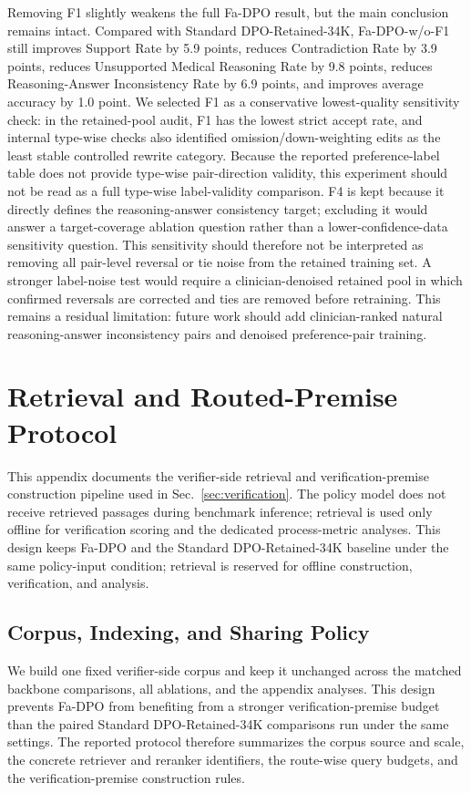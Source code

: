 \documentclass[a4paper,fleqn,doubleblind]{cas-sc}
\begin{document}
Removing F1 slightly weakens the full Fa-DPO result, but the main conclusion remains intact. Compared with Standard DPO-Retained-34K, Fa-DPO-w/o-F1 still improves Support Rate by 5.9 points, reduces Contradiction Rate by 3.9 points, reduces Unsupported Medical Reasoning Rate by 9.8 points, reduces Reasoning-Answer Inconsistency Rate by 6.9 points, and improves average accuracy by 1.0 point. We selected F1 as a conservative lowest-quality sensitivity check: in the retained-pool audit, F1 has the lowest strict accept rate, and internal type-wise checks also identified omission/down-weighting edits as the least stable controlled rewrite category. Because the reported preference-label table does not provide type-wise pair-direction validity, this experiment should not be read as a full type-wise label-validity comparison. F4 is kept because it directly defines the reasoning-answer consistency target; excluding it would answer a target-coverage ablation question rather than a lower-confidence-data sensitivity question. This sensitivity should therefore not be interpreted as removing all pair-level reversal or tie noise from the retained training set. A stronger label-noise test would require a clinician-denoised retained pool in which confirmed reversals are corrected and ties are removed before retraining. This remains a residual limitation: future work should add clinician-ranked natural reasoning-answer inconsistency pairs and denoised preference-pair training.

\section{Retrieval and Routed-Premise Protocol}
\label{app:retrieval_protocol}

This appendix documents the verifier-side retrieval and verification-premise construction pipeline used in Sec.~\ref{sec:verification}. The policy model does not receive retrieved passages during benchmark inference; retrieval is used only offline for verification scoring and the dedicated process-metric analyses. This design keeps Fa-DPO and the Standard DPO-Retained-34K baseline under the same policy-input condition; retrieval is reserved for offline construction, verification, and analysis.

\subsection{Corpus, Indexing, and Sharing Policy}

We build one fixed verifier-side corpus and keep it unchanged across the matched backbone comparisons, all ablations, and the appendix analyses. This design prevents Fa-DPO from benefiting from a stronger verification-premise budget than the paired Standard DPO-Retained-34K comparisons run under the same settings. The reported protocol therefore summarizes the corpus source and scale, the concrete retriever and reranker identifiers, the route-wise query budgets, and the verification-premise construction rules.
\end{document}
